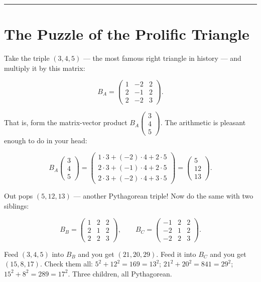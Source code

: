 \documentclass[12pt, letterpaper, openany]{book}
\theoremstyle{definition}
\theoremstyle{remark}
\begin{document}
\bigskip\noindent\rule{\textwidth}{0.4pt}\bigskip



\section*{The Puzzle of the Prolific Triangle}


Take the triple $(3, 4, 5)$ --- the most famous right triangle in history --- and multiply it by this matrix:

\[
B_A = \begin{pmatrix} 1 & -2 & 2 \\ 2 & -1 & 2 \\ 2 & -2 & 3 \end{pmatrix}.
\]

That is, form the matrix-vector product $B_A \begin{pmatrix} 3 \\ 4 \\ 5 \end{pmatrix}$. The arithmetic is pleasant enough to do in your head:

\[
B_A \begin{pmatrix} 3 \\ 4 \\ 5 \end{pmatrix} = \begin{pmatrix} 1\cdot3 + (-2)\cdot4 + 2\cdot5 \\ 2\cdot3 + (-1)\cdot4 + 2\cdot5 \\ 2\cdot3 + (-2)\cdot4 + 3\cdot5 \end{pmatrix} = \begin{pmatrix} 5 \\ 12 \\ 13 \end{pmatrix}.
\]

Out pops $(5, 12, 13)$ --- another Pythagorean triple! Now do the same with two siblings:

\[
B_B = \begin{pmatrix} 1 & 2 & 2 \\ 2 & 1 & 2 \\ 2 & 2 & 3 \end{pmatrix}, \qquad B_C = \begin{pmatrix} -1 & 2 & 2 \\ -2 & 1 & 2 \\ -2 & 2 & 3 \end{pmatrix}.
\]

Feed $(3, 4, 5)$ into $B_B$ and you get $(21, 20, 29)$. Feed it into $B_C$ and you get $(15, 8, 17)$. Check them all: $5^2 + 12^2 = 169 = 13^2$; $21^2 + 20^2 = 841 = 29^2$; $15^2 + 8^2 = 289 = 17^2$. Three children, all Pythagorean.
\end{document}
